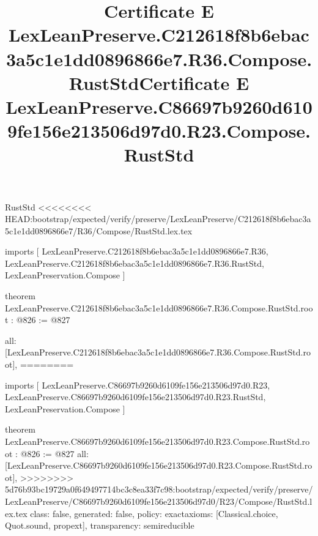 \begin{lexlean}{RustStd}
<<<<<<<< HEAD:bootstrap/expected/verify/preserve/LexLeanPreserve/C212618f8b6ebac3a5c1e1dd0896866e7/R36/Compose/RustStd.lex.tex
\title{Certificate E LexLeanPreserve.C212618f8b6ebac3a5c1e1dd0896866e7.R36.Compose.RustStd}
\begin{coremodule}
imports [
  LexLeanPreserve.C212618f8b6ebac3a5c1e1dd0896866e7.R36,
  LexLeanPreserve.C212618f8b6ebac3a5c1e1dd0896866e7.R36.RustStd,
  LexLeanPreservation.Compose
]

theorem LexLeanPreserve.C212618f8b6ebac3a5c1e1dd0896866e7.R36.Compose.RustStd.root : @826 := @827 {
  all: [LexLeanPreserve.C212618f8b6ebac3a5c1e1dd0896866e7.R36.Compose.RustStd.root],
========
\title{Certificate E LexLeanPreserve.C86697b9260d6109fe156e213506d97d0.R23.Compose.RustStd}
\begin{coremodule}
imports [
  LexLeanPreserve.C86697b9260d6109fe156e213506d97d0.R23,
  LexLeanPreserve.C86697b9260d6109fe156e213506d97d0.R23.RustStd,
  LexLeanPreservation.Compose
]

theorem LexLeanPreserve.C86697b9260d6109fe156e213506d97d0.R23.Compose.RustStd.root : @826 := @827 {
  all: [LexLeanPreserve.C86697b9260d6109fe156e213506d97d0.R23.Compose.RustStd.root],
>>>>>>>> 5d76b93bc19729a0f649497714bc3c8ea33f7c98:bootstrap/expected/verify/preserve/LexLeanPreserve/C86697b9260d6109fe156e213506d97d0/R23/Compose/RustStd.lex.tex
  class: false,
  generated: false,
  policy: exact{axioms: [Classical.choice, Quot.sound, propext]},
  transparency: semireducible
}


\end{coremodule}}
\end{coremodule}
\end{lexlean}
